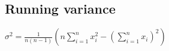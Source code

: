 \subsection{Running variance}
$\sigma^{2}=\frac{1}{n(n-1)}\left(n\sum_{i=1}^{n}x_{i}^2-\left(\sum_{i=1}^{n}x_i\right)^2\right)$

